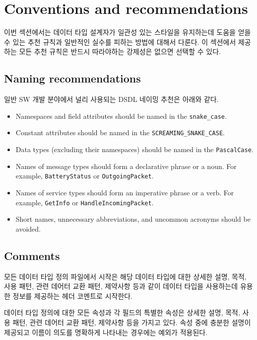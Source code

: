 \section{Conventions and recommendations}

이번 섹션에서는 데이터 타입 설계자가 일관성 있는 스타일을 유지하는데 도움을 얻을 수 있는 추천 규칙과 일반적인 실수를 피하는 방법에 대해서 다룬다.
이 섹션에서 제공하는 모든 추천 규칙은 반드시 따라야하는 강제성은 없으면 선택할 수 있다.

\subsection{Naming recommendations}

일반 SW 개발 분야에서 널리 사용되는 DSDL 네이밍 추천은 아래와 같다.

\begin{itemize}
    \item Namespaces and field attributes should be named in the \verb|snake_case|.
    \item Constant attributes should be named in the \verb|SCREAMING_SNAKE_CASE|.
    \item Data types (excluding their namespaces) should be named in the \verb|PascalCase|.
    \item Names of message types should form a declarative phrase or a noun. For example,
          \verb|BatteryStatus| or \verb|OutgoingPacket|.
    \item Names of service types should form an imperative phrase or a verb. For example,
          \verb|GetInfo| or \verb|HandleIncomingPacket|.
    \item Short names, unnecessary abbreviations, and uncommon acronyms should be avoided.
\end{itemize}

\subsection{Comments}

모든 데이터 타입 정의 파일에서 시작은 해당 데이터 타입에 대한 상세한 설명, 목적, 사용 패턴, 관련 데어터 교환 패턴, 제약사항 등과 같이 데이터 타입을 사용하는데 유용한 정보를 제공하는 헤더 코멘트로 시작한다.

데이터 타입 정의에 대한 모든 속성과 각 필드의 특별한 속성은 상세한 설명, 목적, 사용 패턴, 관련 데어터 교환 패턴, 제약사항 등을 가지고 있다.
속성 중에 충분한 설명이 제공되고 이름이 의도를 명확하게 나타내는 경우에는 예외가 적용된다.


